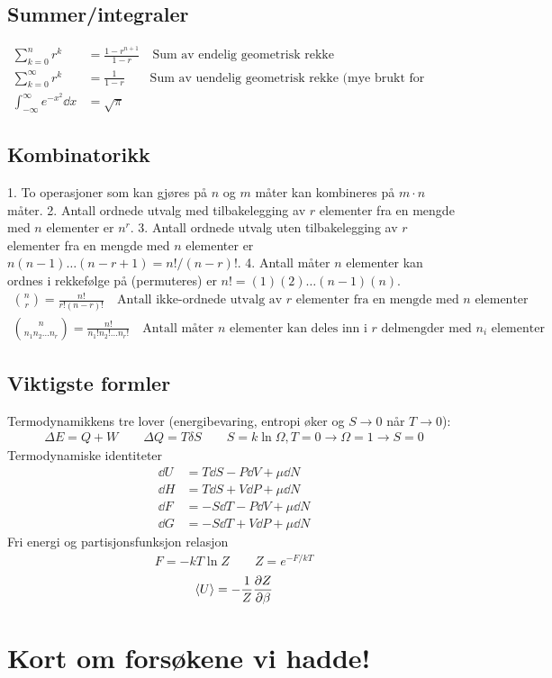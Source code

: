 \documentclass[12pt]{article}
\newcommand{\mean}[1]{\langle #1 \rangle}
\begin{document}
\subsection{Summer/integraler}
\begin{align*}
  \sum_{k = 0}^{n} r^k &= \frac{1 - r^{n+1}}{1 - r} \quad \text{Sum av endelig geometrisk rekke}\\
  \sum_{k = 0}^{\infty} r^k &= \frac{1}{1-r} \qquad \text{Sum av uendelig geometrisk rekke (mye brukt for partisjonsfunksjoner/Gibbssummer)} \\
  \int_{-\infty}^\infty e^{-x^2} \dd x &= \sqrt{\pi}
\end{align*}
\subsection{Kombinatorikk}
1. To operasjoner som kan gjøres på $n$ og $m$ måter kan kombineres på $m \cdot n$ måter.
2. Antall ordnede utvalg med tilbakelegging av $r$ elementer fra en mengde med $n$ elementer er $n^r$.
3. Antall ordnede utvalg uten tilbakelegging av $r$ elementer fra en mengde med $n$ elementer er $n(n-1)\hdots (n-r+1) = n!/(n-r)!$.
4. Antall måter $n$ elementer kan ordnes i rekkefølge på (permuteres) er $n! = (1)(2)\hdots(n-1)(n)$.
\begin{align*}
  \binom{n}{r} = \frac{n!}{r!(n-r)!} \quad \text{Antall ikke-ordnede utvalg av $r$ elementer fra en mengde med $n$ elementer} \\
  \binom{n}{n_1 n_2 \hdots n_r} = \frac{n!}{n_1! n_2! \hdots n_r!} \quad \text{Antall måter $n$ elementer kan deles inn i $r$ delmengder med $n_i$ elementer}
\end{align*}
\subsection{Viktigste formler}
Termodynamikkens tre lover (energibevaring, entropi øker og $S \rightarrow 0$ når $T \rightarrow 0$):
\begin{align*}
  \Delta E = Q + W \qquad \Delta{Q} = T \delta{S} \qquad S = k \ln{\Omega}, T = 0 \rightarrow \Omega = 1 \rightarrow S = 0
\end{align*}
Termodynamiske identiteter
\begin{align*}
  \dd U &= T \dd S - P \dd V + \mu \dd N \\
  \dd H &= T \dd S + V \dd P + \mu \dd N \\
  \dd F &= -S \dd T - P \dd V + \mu \dd N \\
  \dd G &= -S \dd T + V \dd P + \mu \dd N
\end{align*}
Fri energi og partisjonsfunksjon relasjon
\begin{align*}
  F = -kT \ln{Z} \qquad Z = e^{-F/kT}
\end{align*}
\begin{align*}
  \mean{U} = - \frac{1}{Z} \pdv{Z}{\beta}
\end{align*}
\section{Kort om forsøkene vi hadde! }
\end{document}
